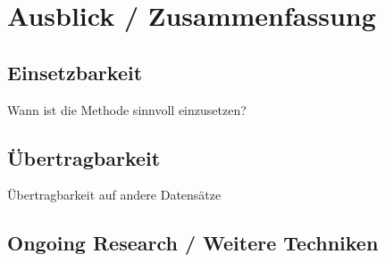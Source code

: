 \chapter{Ausblick / Zusammenfassung}

\label{conclusion}

\section{Einsetzbarkeit}
Wann ist die Methode sinnvoll einzusetzen?

\section{Übertragbarkeit}
Übertragbarkeit auf andere Datensätze

\section{Ongoing Research / Weitere Techniken}